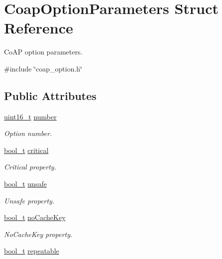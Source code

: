 \hypertarget{structCoapOptionParameters}{}\section{Coap\+Option\+Parameters Struct Reference}
\label{structCoapOptionParameters}


Co\+AP option parameters.  




{\ttfamily \#include \char`\"{}coap\+\_\+option.\+h\char`\"{}}

\subsection*{Public Attributes}
\begin{DoxyCompactItemize}
\item 
\hyperlink{stdint_8h_a273cf69d639a59973b6019625df33e30}{uint16\+\_\+t} \hyperlink{structCoapOptionParameters_a149855f85b884bee212aa0edb485665c}{number}
\begin{DoxyCompactList}\small\item\em Option number. \end{DoxyCompactList}\item 
\hyperlink{compiler__port_8h_a812d16e5494522586b3784e55d479912}{bool\+\_\+t} \hyperlink{structCoapOptionParameters_aa01ccc66a6195f98f592cb8acacd54d2}{critical}
\begin{DoxyCompactList}\small\item\em Critical property. \end{DoxyCompactList}\item 
\hyperlink{compiler__port_8h_a812d16e5494522586b3784e55d479912}{bool\+\_\+t} \hyperlink{structCoapOptionParameters_af8d4d98ab12734ed72e7f52d0792b75b}{unsafe}
\begin{DoxyCompactList}\small\item\em Unsafe property. \end{DoxyCompactList}\item 
\hyperlink{compiler__port_8h_a812d16e5494522586b3784e55d479912}{bool\+\_\+t} \hyperlink{structCoapOptionParameters_a1fd05d8feeb0244022299e6dc8ac0d25}{no\+Cache\+Key}
\begin{DoxyCompactList}\small\item\em No\+Cache\+Key property. \end{DoxyCompactList}\item 
\hyperlink{compiler__port_8h_a812d16e5494522586b3784e55d479912}{bool\+\_\+t} \hyperlink{structCoapOptionParameters_abcdabdb74a439a64a977e6fd758d91d8}{repeatable}

\end{DoxyCompactItemize}
